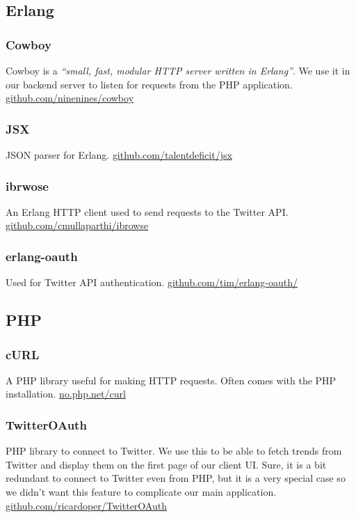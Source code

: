 \subsection{Erlang}
\subsubsection{Cowboy}
Cowboy is a \textit{``small, fast, modular HTTP server written in Erlang''}. We
use it in our backend server to listen for requests from the PHP application.
\newline
\href{https://github.com/ninenines/cowboy}{github.com/ninenines/cowboy}
\subsubsection{JSX}
JSON parser for Erlang. \newline
\href{https://github.com/talentdeficit/jsx}{github.com/talentdeficit/jsx}
\subsubsection{ibrwose}
An Erlang HTTP client used to send requests to the Twitter API. \newline
\href{https://github.com/cmullaparthi/ibrowse}{github.com/cmullaparthi/ibrowse}
\subsubsection{erlang-oauth}
Used for Twitter API authentication. \newline
\href{https://github.com/tim/erlang-oauth/}{github.com/tim/erlang-oauth/}

\subsection{PHP}
\subsubsection{cURL}
A PHP library useful for making HTTP requests. Often comes with the PHP
installation. \newline
\href{http://no.php.net/curl}{no.php.net/curl}
\subsubsection{TwitterOAuth}
PHP library to connect to Twitter. We use this to be able to fetch trends from
Twitter and display them on the first page of our client UI. Sure, it is a bit
redundant to connect to Twitter even from PHP, but it is a very special case so
we didn't want this feature to complicate our main application. \newline
\href{https://github.com/ricardoper/TwitterOAuth}
   {github.com/ricardoper/TwitterOAuth}
